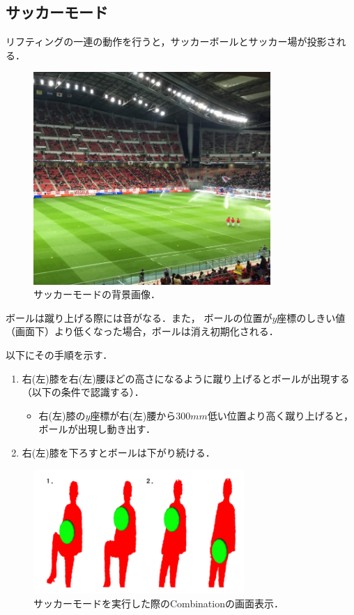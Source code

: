 \clearpage

\subsection{サッカーモード}
リフティングの一連の動作を行うと，サッカーボールとサッカー場が投影される．
\vspace{1cm}
\begin{figure}[h]
    \centering
    \includegraphics[width=9cm]{image/soccer_back.jpg}
    \caption[サッカーモードの背景画像]{サッカーモードの背景画像．}
  \label{soccerback}
\end{figure}
\vspace{1cm}

ボールは蹴り上げる際には音がなる．また，
ボールの位置が$y$座標のしきい値（画面下）より低くなった場合，ボールは消え初期化される．

以下にその手順を示す．

\begin{enumerate}
    \item 右(左)膝を右(左)腰ほどの高さになるように蹴り上げるとボールが出現する（以下の条件で認識する）．
        \begin{itemize}
            \item 右(左)膝の$y$座標が右(左)腰から$300mm$低い位置より高く蹴り上げると，ボールが出現し動き出す．            
        \end{itemize}
    \item 右(左)膝を下ろすとボールは下がり続ける．
\end{enumerate}

\vspace{1cm}
\begin{figure}[h]
    \centering
    \includegraphics[width=8cm]{image/soccer.png}
    \caption[サッカーモードを実行した際のCombinationの画面表示]{サッカーモードを実行した際のCombinationの画面表示．}
  \label{baseball}
\end{figure}

